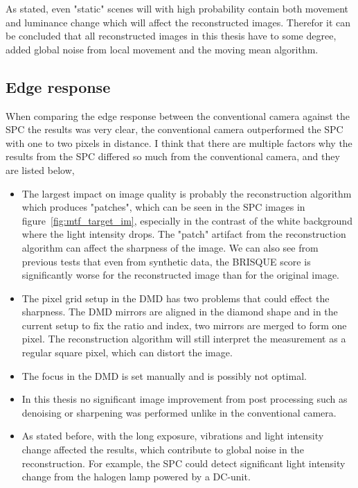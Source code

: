 As stated, even "static" scenes will with high probability contain both movement and luminance change which will affect the reconstructed images. Therefor it can be concluded that all reconstructed images in this thesis have to some degree, added global noise from local movement and the moving mean algorithm.


\subsection{Edge response}
When comparing the edge response between the conventional camera against the SPC the results was very clear, the conventional camera outperformed the SPC with one to two pixels in distance. I think that there are multiple factors why the results from the SPC differed so much from the conventional camera, and they are listed below,

\begin{itemize}
\item The largest impact on image quality is probably the reconstruction algorithm which produces "patches", which can be seen in the SPC images in figure~\ref{fig:mtf_target_im}, especially in the contrast of the white background where the light intensity drops. The "patch" artifact from the reconstruction algorithm can affect the sharpness of the image. We can also see from previous tests that even from synthetic data, the BRISQUE score is significantly worse for the reconstructed image than for the original image.

\item The pixel grid setup in the DMD has two problems that could effect the sharpness. The DMD mirrors are aligned in the diamond shape and in the current setup to fix the ratio and index, two mirrors are merged to form one pixel. The reconstruction algorithm will still interpret the measurement as a regular square pixel, which can distort the image.

\item The focus in the DMD is set manually and is possibly not optimal.

\item In this thesis no significant image improvement from post processing such as denoising or sharpening was performed unlike in the conventional camera.

\item As stated before, with the long exposure, vibrations and light intensity change affected the results, which contribute to global noise in the reconstruction. For example, the SPC could detect significant light intensity change from the halogen lamp powered by a DC-unit.

\end{itemize}

